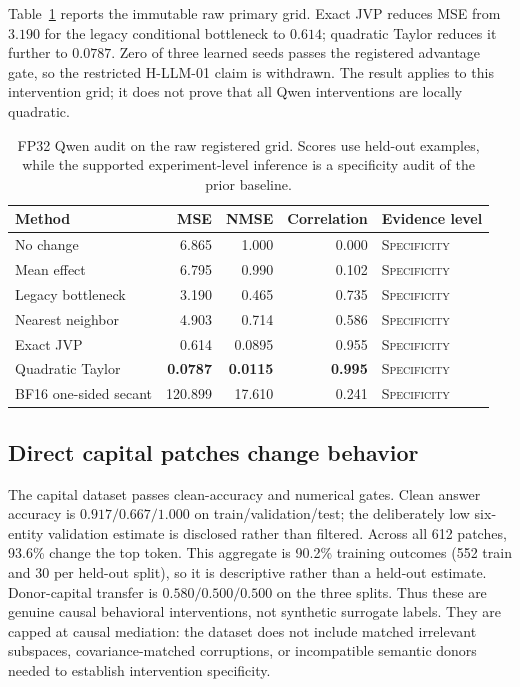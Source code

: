 \documentclass[10pt]{article}
\newcommand{\level}[1]{{\scriptsize\textsc{#1}}}
\begin{document}
Table~\ref{tab:qwen-audit} reports the immutable raw primary grid.  Exact JVP
reduces MSE from $3.190$ for the legacy conditional bottleneck to $0.614$;
quadratic Taylor reduces it further to $0.0787$.  Zero of three learned seeds
passes the registered advantage gate, so the restricted H-LLM-01 claim is
withdrawn.  The result applies to this intervention grid; it does not prove
that all Qwen interventions are locally quadratic.

\begin{table}[t]
\centering
\small
\caption{FP32 Qwen audit on the raw registered grid.  Scores use held-out
examples, while the supported experiment-level inference is a specificity
audit of the prior baseline.}
\label{tab:qwen-audit}
\begin{tabular}{@{}lrrrl@{}}
\toprule
Method & MSE & NMSE & Correlation & Evidence level \\
\midrule
No change & 6.865 & 1.000 & 0.000 & \level{Specificity} \\
Mean effect & 6.795 & 0.990 & 0.102 & \level{Specificity} \\
Legacy bottleneck & 3.190 & 0.465 & 0.735 & \level{Specificity} \\
Nearest neighbor & 4.903 & 0.714 & 0.586 & \level{Specificity} \\
Exact JVP & 0.614 & 0.0895 & 0.955 & \level{Specificity} \\
Quadratic Taylor & \textbf{0.0787} & \textbf{0.0115} & \textbf{0.995} & \level{Specificity} \\
BF16 one-sided secant & 120.899 & 17.610 & 0.241 & \level{Specificity} \\
\bottomrule
\end{tabular}
\end{table}

\subsection{Direct capital patches change behavior}

The capital dataset passes clean-accuracy and numerical gates.  Clean answer
accuracy is $0.917/0.667/1.000$ on train/validation/test; the deliberately low
six-entity validation estimate is disclosed rather than filtered.  Across all
612 patches, 93.6\% change the top token.  This aggregate is 90.2\% training
outcomes (552 train and 30 per held-out split), so it is descriptive rather
than a held-out estimate.  Donor-capital transfer is
$0.580/0.500/0.500$ on the three splits.  Thus these are genuine causal
behavioral interventions, not synthetic surrogate labels.
They are capped at causal mediation: the dataset does not include matched
irrelevant subspaces, covariance-matched corruptions, or incompatible semantic
donors needed to establish intervention specificity.
\end{document}

